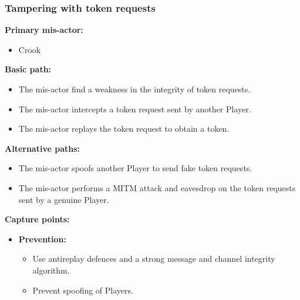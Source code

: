 \documentclass[a4paper,11pt]{report}
\begin{document}
\subsubsection{Tampering with token requests}
\textbf{Primary mis-actor:}
\begin{itemize}
\item Crook
\end{itemize}
\textbf{Basic path:}
\begin{itemize}
\item The mis-actor find a weakness in the integrity of token requests.
\item The mis-actor intercepts a token request sent by another Player.
\item The mis-actor replays the token request to obtain a token.
\end{itemize}
\textbf{Alternative paths:}
\begin{itemize}
\item The mis-actor spoofs another Player to send fake token requests.
\item The mis-actor performs a MITM attack and eavesdrop on the token requests sent by a genuine Player.
\end{itemize}
\textbf{Capture points:}
\begin{itemize}
\item \textbf{Prevention:}
\begin{itemize}
\item Use antireplay defences and a strong message and channel integrity algorithm.
\item Prevent spoofing of Players.
\end{itemize}
\end{itemize}
\end{document}
